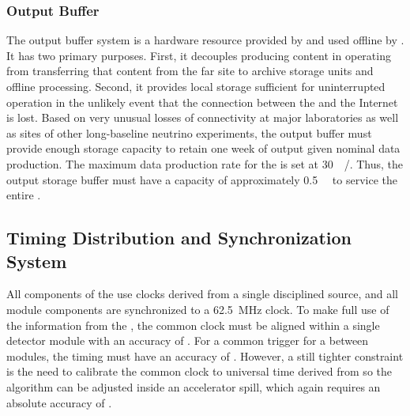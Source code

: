 
\subsubsection{Output Buffer}


The output buffer system is a hardware resource provided by  and used offline by . 
It has two primary purposes. 
First, it decouples producing content in operating  from transferring that content from the far site to archive storage units and offline processing. 
Second, it provides local storage sufficient for uninterrupted  operation in the unlikely event that the connection between the  and the Internet is lost. 
Based on very unusual losses of connectivity at major laboratories as well as  sites of other long-baseline neutrino experiments, the output buffer must provide enough storage capacity to retain one week of output given nominal data production. 
The maximum data production rate for the  is set at \SI{30}{\peta\byte/\year}. 
Thus, the output storage buffer must have a capacity of approximately \SI{0.5}{\peta\byte} to service the entire .


\subsection{Timing Distribution and Synchronization System}
\label{sec:sp-daq:design-timing}

All components of the  use clocks derived from a single  disciplined source, and all module components are synchronized to a \SI{62.5}{MHz} clock. 
To make full use of the information from the , the common clock must be aligned within a single detector %
module with an accuracy of . 
For a common trigger for a  between modules, the timing must have an accuracy of .
However, a still tighter constraint is the need to calibrate the common clock to universal time derived from  so the  algorithm can be adjusted inside an accelerator spill, which again requires an absolute accuracy of .

